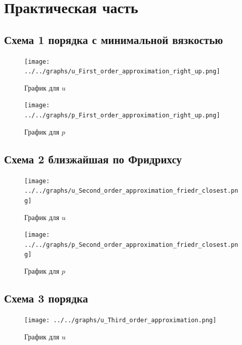 \documentclass[a4paper, 12pt]{article} %
\begin{document}
\newpage
\section{Практическая часть}

\subsection{Схема 1 порядка с минимальной вязкостью}

\begin{figure}[h!]
    \centering
    \texttt{[image: ../../graphs/u\_First\_order\_approximation\_right\_up.png]}
    \caption{График для $u$ \\ }
    \label{fig:vac}
\end{figure}

\begin{figure}[h!]
    \centering
    \texttt{[image: ../../graphs/p\_First\_order\_approximation\_right\_up.png]}
    \caption{График для $p$ \\ }
    \label{fig:vac}
\end{figure}

\newpage
\subsection{Схема 2 близжайшая по Фридрихсу}

\begin{figure}[h!]
    \centering
    \texttt{[image: ../../graphs/u\_Second\_order\_approximation\_friedr\_closest.png]}
    \caption{График для $u$ \\ }
    \label{fig:vac}
\end{figure}

\begin{figure}[h!]
    \centering
    \texttt{[image: ../../graphs/p\_Second\_order\_approximation\_friedr\_closest.png]}
    \caption{График для $p$ \\ }
    \label{fig:vac}
\end{figure}

\newpage
\subsection{Схема 3 порядка}

\begin{figure}[h!]
    \centering
    \texttt{[image: ../../graphs/u\_Third\_order\_approximation.png]}
    \caption{График для $u$ \\ }
    \label{fig:vac}
\end{figure}
\end{document}
